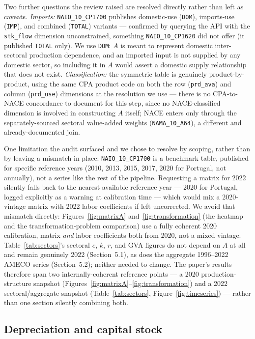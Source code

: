 \documentclass[11pt]{article}
\begin{document}
Two further questions the review raised are resolved directly rather
than left as caveats. \emph{Imports:} \texttt{NAIO\_10\_CP1700} publishes
domestic-use (\texttt{DOM}), imports-use (\texttt{IMP}), and combined
(\texttt{TOTAL}) variants --- confirmed by querying the API with the
\texttt{stk\_flow} dimension unconstrained, something
\texttt{NAIO\_10\_CP1620} did not offer (it published \texttt{TOTAL}
only). We use \texttt{DOM}: $A$ is meant to represent domestic
inter-sectoral production dependence, and an imported input is not
supplied by any domestic sector, so including it in $A$ would assert a
domestic supply relationship that does not exist. \emph{Classification:}
the symmetric table is genuinely product-by-product, using the same CPA
product code on both the row (\texttt{prd\_ava}) and column
(\texttt{prd\_use}) dimensions at the resolution we use --- there is no
CPA-to-NACE concordance to document for this step, since no NACE-classified
dimension is involved in constructing $A$ itself; NACE enters only
through the separately-sourced sectoral value-added weights
(\texttt{NAMA\_10\_A64}), a different and already-documented join.

One limitation the audit surfaced and we chose to resolve by scoping,
rather than by leaving a mismatch in place: \texttt{NAIO\_10\_CP1700} is
a benchmark table, published for specific reference years (2010, 2013,
2015, 2017, 2020 for Portugal, not annually), not a series like the rest
of the pipeline. Requesting a matrix for 2022 silently falls back to the
nearest available reference year --- 2020 for Portugal, logged
explicitly as a warning at calibration time --- which would mix a
2020-vintage matrix with 2022 labor coefficients if left uncorrected. We
avoid that mismatch directly: Figures~\ref{fig:matrixA}
and~\ref{fig:transformation} (the heatmap and the transformation-problem
comparison) use a fully coherent 2020 calibration, matrix \emph{and}
labor coefficients both from 2020, not a mixed vintage. Table~\ref{tab:sectors}'s
sectoral $e$, $k$, $r$, and GVA figures do not depend on $A$ at all and
remain genuinely 2022 (Section~5.1), as does the aggregate 1996--2022
AMECO series (Section~5.2); neither needed to change. The paper's
results therefore span two internally-coherent reference points --- a
2020 production-structure snapshot (Figures~\ref{fig:matrixA}--\ref{fig:transformation})
and a 2022 sectoral/aggregate snapshot (Table~\ref{tab:sectors},
Figure~\ref{fig:timeseries}) --- rather than one section silently
combining both.

\subsection{Depreciation and capital stock}
\end{document}
